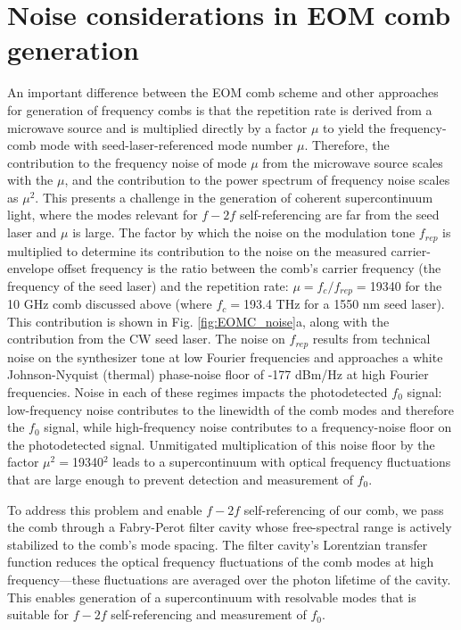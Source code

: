 \section{Noise considerations in EOM comb generation}

An important difference between the EOM comb scheme and other approaches for generation of frequency combs is that the repetition rate is derived from a microwave source and is multiplied directly by a factor $\mu$ to yield the frequency-comb mode with seed-laser-referenced mode number $\mu$. Therefore, the contribution to the frequency noise of mode $\mu$ from the microwave source scales with the $\mu$, and the contribution to the power spectrum of frequency noise scales as $\mu^2$. This presents a challenge in the generation of coherent supercontinuum light, where the modes relevant for $f-2f$ self-referencing are far from the seed laser and $\mu$ is large. The factor by which the noise on the modulation tone $f_{rep}$ is multiplied to determine its contribution to the noise on the measured carrier-envelope offset frequency is the ratio between the comb's carrier frequency (the frequency of the seed laser) and the repetition rate: $\mu=f_c/f_{rep}=$19340 for the 10 GHz comb discussed above (where $f_c=$193.4 THz for a 1550 nm seed laser). This contribution is shown in Fig. \ref{fig:EOMC_noise}a, along with the contribution from the CW seed laser. The noise on $f_{rep}$ results from technical noise on the synthesizer tone at low Fourier frequencies and approaches a white Johnson-Nyquist (thermal) phase-noise floor of -177 dBm/Hz at high Fourier frequencies. Noise in each of these regimes impacts the photodetected $f_0$ signal: low-frequency noise contributes to the linewidth of the comb modes and therefore the $f_0$ signal, while high-frequency noise contributes to a frequency-noise floor on the photodetected signal\cite{DiDomenico2010}. Unmitigated multiplication of this noise floor by the factor $\mu^2=$19340$^2$ leads to a supercontinuum with optical frequency fluctuations that are large enough to prevent detection and measurement of $f_0$. 

To address this problem and enable $f-2f$ self-referencing of our comb, we pass the comb through a Fabry-Perot filter cavity whose free-spectral range is actively stabilized to the comb's mode spacing. The filter cavity's Lorentzian transfer function reduces the optical frequency fluctuations of the comb modes at high frequency---these fluctuations are averaged over the photon lifetime of the cavity. This enables generation of a supercontinuum with resolvable modes that is suitable for $f-2f$ self-referencing and measurement of $f_0$. 

